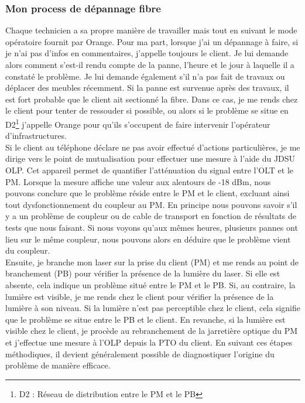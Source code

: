 \documentclass[12pt, a4paper]{article}
\begin{document}
\subsubsection{Mon process de dépannage fibre}
Chaque technicien a sa propre manière de travailler mais tout en 
suivant le mode opératoire fournit par Orange. Pour ma part, 
lorsque j'ai un dépannage à faire, si je n'ai pas d'infos en commentaires,
j'appelle toujours le client. Je lui demande alors comment s'est-il
rendu compte de la panne, l'heure et le jour à laquelle il a 
constaté le problème. Je lui demande également s'il n'a pas fait de travaux
ou déplacer des meubles récemment. Si la panne est survenue après
des travaux, il est fort probable que le client ait sectionné la fibre.
Dans ce cas, je me rends chez le client pour tenter de ressouder si possible, 
ou alors si le problème se situe
en D2\footnote{D2 : Réseau de distribution entre le PM et le PB} 
j'appelle Orange pour qu'ils s'occupent de faire intervenir l'opérateur
d'infrastructures.\\

Si le client au téléphone déclare ne pas avoir
effectué d'actions particulières, je me dirige
vers le point de mutualisation pour effectuer
une mesure à l'aide du JDSU OLP. Cet appareil
permet de quantifier l'atténuation du signal
entre l'OLT et le PM. Lorsque la mesure affiche
une valeur aux alentours de -18 dBm, nous pouvons
conclure que le problème réside entre le PM et
le client, excluant ainsi tout dysfonctionnement
du coupleur au PM. En principe nous pouvons savoir 
s'il y a un problème de coupleur ou de cable de transport 
en fonction de résultats de tests que nous faisant. Si nous 
voyons qu'aux mêmes heures, plusieurs pannes ont lieu sur
le même coupleur, nous pouvons alors en déduire que le problème
vient du coupleur.\\

Ensuite, je branche mon laser sur la prise du
client (PM) et me rends au point de branchement
(PB) pour vérifier la présence de la lumière
du laser. Si elle est absente, cela indique
un problème situé entre le PM et le PB.
Si, au contraire, la lumière est visible,
je me rends chez le client pour vérifier
la présence de la lumière à son niveau.
Si la lumière n'est pas perceptible chez le
client, cela signifie que le problème se
situe entre le PB et le client. En revanche,
si la lumière est visible chez le client,
je procède au rebranchement de la jarretière
optique du PM et j'effectue une mesure à l'OLP
depuis la PTO du client. En suivant ces étapes
méthodiques, il devient généralement possible
de diagnostiquer l'origine du problème de
manière efficace.
\end{document}
